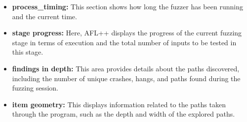 \begin{itemize}
    \item \textbf{process\_timing:} This section shows how long the fuzzer has
    been running and the current time.
    \item \textbf{stage progress:} Here, AFL++ displays the progress of the
    current fuzzing stage in terms of execution and the total number of inputs
    to be tested in this stage.
    \item \textbf{findings in depth:} This area provides details about the paths
    discovered, including the number of unique crashes, hangs, and paths found
    during the fuzzing session.
    \item \textbf{item geometry:} This displays information related to the paths
    taken through the program, such as the depth and width of the explored paths.
\end{itemize}

